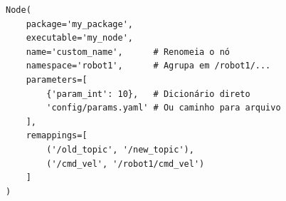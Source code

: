 \documentclass[preview,border=2pt]{standalone}
\begin{document}
\begin{lstlisting}[style=pythonstyle]
Node(
    package='my_package',
    executable='my_node',
    name='custom_name',      # Renomeia o nó
    namespace='robot1',      # Agrupa em /robot1/...
    parameters=[
        {'param_int': 10},   # Dicionário direto
        'config/params.yaml' # Ou caminho para arquivo
    ],
    remappings=[
        ('/old_topic', '/new_topic'),
        ('/cmd_vel', '/robot1/cmd_vel')
    ]
)
\end{lstlisting}
\end{document}
